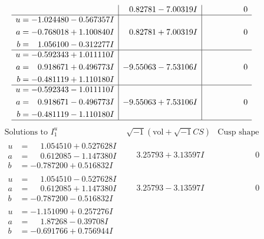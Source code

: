 \documentclass[1p]{elsarticle_modified}
\theoremstyle{definition}
\newcommand{\I}{\sqrt{-1}}
\begin{document}
$$\begin{array}{c|c|c}
 & \phantom{-}0.82781 - 7.00319 I & \phantom{-0.000000 } 0 \\ \hline\begin{aligned}
u &= -1.024480 - 0.567357 I \\
a &= -0.768018 + 1.100840 I \\
b &= \phantom{-}1.056100 - 0.312277 I\end{aligned}
 & \phantom{-}0.82781 + 7.00319 I & \phantom{-0.000000 } 0 \\ \hline\begin{aligned}
u &= -0.592343 + 1.011110 I \\
a &= \phantom{-}0.918671 + 0.496773 I \\
b &= -0.481119 + 1.110180 I\end{aligned}
 & -9.55063 - 7.53106 I & \phantom{-0.000000 } 0 \\ \hline\begin{aligned}
u &= -0.592343 - 1.011110 I \\
a &= \phantom{-}0.918671 - 0.496773 I \\
b &= -0.481119 - 1.110180 I\end{aligned}
 & -9.55063 + 7.53106 I & \phantom{-0.000000 } 0\\
 \hline 
 \end{array}$$\newpage$$\begin{array}{c|c|c}  
\text{Solutions to }I^u_{1}& \I (\text{vol} + \sqrt{-1}CS) & \text{Cusp shape}\\
 \hline 
\begin{aligned}
u &= \phantom{-}1.054510 + 0.527628 I \\
a &= \phantom{-}0.612085 - 1.147380 I \\
b &= -0.787200 + 0.516832 I\end{aligned}
 & \phantom{-}3.25793 + 3.13597 I & \phantom{-0.000000 } 0 \\ \hline\begin{aligned}
u &= \phantom{-}1.054510 - 0.527628 I \\
a &= \phantom{-}0.612085 + 1.147380 I \\
b &= -0.787200 - 0.516832 I\end{aligned}
 & \phantom{-}3.25793 - 3.13597 I & \phantom{-0.000000 } 0 \\ \hline\begin{aligned}
u &= -1.151090 + 0.257276 I \\
a &= \phantom{-}1.87268 - 0.39708 I \\
b &= -0.691766 + 0.756944 I\end{aligned}

\end{array}$$
\end{document}
